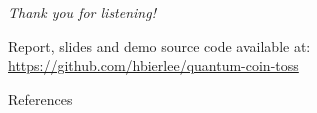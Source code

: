 \documentclass{beamer}
\begin{document}
\begin{frame}[plain,c]

\begin{center}
    \Huge \emph{Thank you for listening!}

\end{center}
\vfill
    \large
    Report, slides and demo source code available at:\\ \quad \url{https://github.com/hbierlee/quantum-coin-toss}

\end{frame}

\begin{frame}{References}
        
        
\end{frame}
\end{document}
